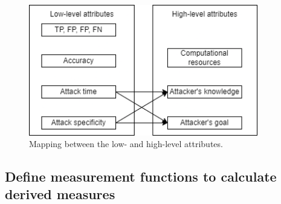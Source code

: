 \begin{figure}[ht!]
  \centering
  \includegraphics[width=10cm]{pictures/attribute_mapping.png}
  \caption{Mapping between the low- and high-level attributes.}
  \label{fig:attribute_mapping}
\end{figure}

\subsection{Define measurement functions to calculate derived measures}
\label{sec:derived_measures}

